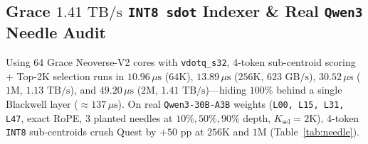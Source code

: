 \documentclass[conference,10pt]{IEEEtran}
\begin{document}
\begin{table}[t]
\centering
\caption{Live $4{\times}$\texttt{GB200} Concurrent Hardware-ATS Scaling Across $96\text{ GiB}$ 48-Layer LPDDR5X ($K_{\text{sel}}{=}2\text{K}$, $P{=}16$).}
\label{tab:scaling}
\end{table}

\subsection{Grace $1.41\text{ TB/s}$ \texttt{INT8 sdot} Indexer \& Real \texttt{Qwen3} Needle Audit}
Using 64 Grace Neoverse-V2 cores with \texttt{vdotq\_s32}, 4-token sub-centroid scoring + Top-2K selection runs in \textbf{$10.96\,\mu\text{s}$} ($64\text{K}$), \textbf{$13.89\,\mu\text{s}$} ($256\text{K}$, $623\text{ GB/s}$), \textbf{$30.52\,\mu\text{s}$} ($1\text{M}$, \textbf{$1.13\text{ TB/s}$}), and \textbf{$49.20\,\mu\text{s}$} ($2\text{M}$, \textbf{$1.41\text{ TB/s}$})---hiding $100\%$ behind a single Blackwell layer ($\approx 137\,\mu\text{s}$). On real \texttt{Qwen3-30B-A3B} weights (\texttt{L00, L15, L31, L47}, exact RoPE, 3 planted needles at $10\%, 50\%, 90\%$ depth, $K_{\text{sel}}{=}2\text{K}$), 4-token \texttt{INT8} sub-centroids crush Quest by $+50\text{ pp}$ at $256\text{K}$ and $1\text{M}$ (Table~\ref{tab:needle}).
\end{document}
